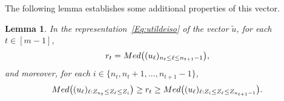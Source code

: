 \documentclass[12pt]{article}
\newtheorem{lemma}[theorem]{Lemma}
\begin{document}
 The following lemma establishes some additional properties of this vector.
\begin{lemma}\label{lem:characterizing-isotonic-L1-projection_}
In the representation~\eqref{Eq:utildeiso} of the vector $\tilde{u}$, for each $t\in[m-1]$,     \begin{equation}\label{eq:cumulative-median-equals}
    r_t = \textnormal{Med}\bigl((u_\ell)_{n_t \leq \ell \leq n_{t+1}-1}\bigr) ,
    \end{equation}
    and moreover, for each $i \in \{n_t,n_t+1,\ldots,n_{t+1}-1\}$,
\begin{equation}\label{eq:cumulative-median-inequalities}
    \textnormal{Med}\bigl((u_\ell)_{\ell:Z_{n_t}\leq Z_\ell\leq Z_i}\bigr) 
        \geq r_t \geq  \textnormal{Med}\bigl((u_\ell)_{\ell:Z_i\leq Z_\ell\leq Z_{n_{t+1}-1}}\bigr).    
    \end{equation}
\end{lemma}
\end{document}
